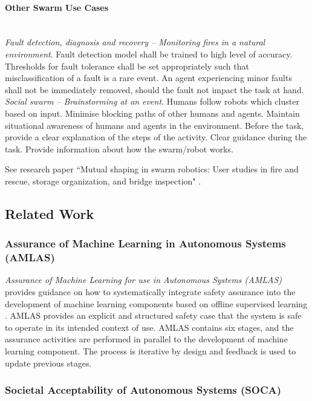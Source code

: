 \documentclass[lettersize,journal]{IEEEtran}
\begin{document}
\paragraph*{Other Swarm Use Cases}
\emph{\\Fault detection, diagnosis and recovery – Monitoring fires in a natural environment}. Fault detection model shall be trained to high level of accuracy. Thresholds for fault tolerance shall be set appropriately such that misclassification of a fault is a rare event. An agent experiencing minor faults shall not be immediately removed, should the fault not impact the task at hand. \\
\emph{\noindent Social swarm – Brainstorming at an event}. Humans follow robots which cluster based on input. Minimise blocking paths of other humans and agents. Maintain situational awareness of humans and agents in the environment. Before the task, provide a clear explanation of the steps of the activity. Clear guidance during the task. Provide information about how the swarm/robot works.

\noindent See research paper ``Mutual shaping in swarm robotics: User studies in fire and rescue, storage organization, and bridge inspection" \cite{Carrillo-Zapata2020}.

\subsection{Related Work}\label{relatedwork}

\subsubsection{Assurance of Machine Learning in Autonomous Systems (AMLAS)}
\textit{Assurance of Machine Learning for use in Autonomous Systems (AMLAS)} provides guidance on how to systematically integrate safety assurance into the development of machine learning components based on offline supervised learning \cite{AMLAS2021}. 
AMLAS provides an explicit and structured safety case that the system is safe to operate in its intended context of use. 
AMLAS contains six stages, and the assurance activities are performed in parallel to the development of machine learning component. 
The process is iterative by design and feedback is used to update previous stages. 

\subsubsection{Societal Acceptability of Autonomous Systems (SOCA)}
\cite{Porter2022,McDermid2021}
\end{document}
